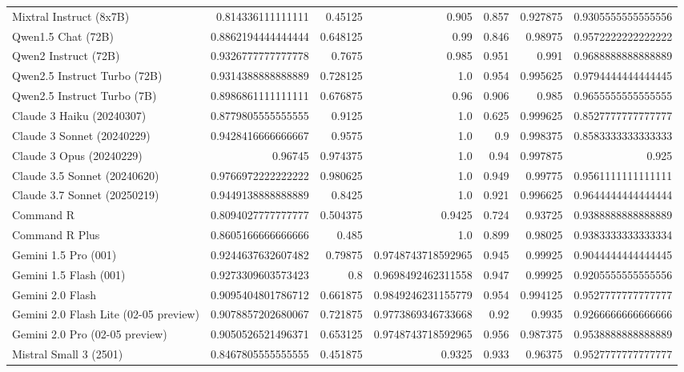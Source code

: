 \begin{table}[htp]
{\begin{tabular}{lrrrrrr}
Mixtral Instruct (8x7B) & 0.814336111111111 & 0.45125 & 0.905 & 0.857 & 0.927875 & 0.9305555555555556 \\
Qwen1.5 Chat (72B) & 0.8862194444444444 & 0.648125 & 0.99 & 0.846 & 0.98975 & 0.9572222222222222 \\
Qwen2 Instruct (72B) & 0.9326777777777778 & 0.7675 & 0.985 & 0.951 & 0.991 & 0.9688888888888889 \\
Qwen2.5 Instruct Turbo (72B) & 0.9314388888888889 & 0.728125 & 1.0 & 0.954 & 0.995625 & 0.9794444444444445 \\
Qwen2.5 Instruct Turbo (7B) & 0.8986861111111111 & 0.676875 & 0.96 & 0.906 & 0.985 & 0.9655555555555555 \\
Claude 3 Haiku (20240307) & 0.8779805555555555 & 0.9125 & 1.0 & 0.625 & 0.999625 & 0.8527777777777777 \\
Claude 3 Sonnet (20240229) & 0.9428416666666667 & 0.9575 & 1.0 & 0.9 & 0.998375 & 0.8583333333333333 \\
Claude 3 Opus (20240229) & 0.96745 & 0.974375 & 1.0 & 0.94 & 0.997875 & 0.925 \\
Claude 3.5 Sonnet (20240620) & 0.9766972222222222 & 0.980625 & 1.0 & 0.949 & 0.99775 & 0.9561111111111111 \\
Claude 3.7 Sonnet (20250219) & 0.9449138888888889 & 0.8425 & 1.0 & 0.921 & 0.996625 & 0.9644444444444444 \\
Command R & 0.8094027777777777 & 0.504375 & 0.9425 & 0.724 & 0.93725 & 0.9388888888888889 \\
Command R Plus & 0.8605166666666666 & 0.485 & 1.0 & 0.899 & 0.98025 & 0.9383333333333334 \\
Gemini 1.5 Pro (001) & 0.9244637632607482 & 0.79875 & 0.9748743718592965 & 0.945 & 0.99925 & 0.9044444444444445 \\
Gemini 1.5 Flash (001) & 0.9273309603573423 & 0.8 & 0.9698492462311558 & 0.947 & 0.99925 & 0.9205555555555556 \\
Gemini 2.0 Flash & 0.9095404801786712 & 0.661875 & 0.9849246231155779 & 0.954 & 0.994125 & 0.9527777777777777 \\
Gemini 2.0 Flash Lite (02-05 preview) & 0.9078857202680067 & 0.721875 & 0.9773869346733668 & 0.92 & 0.9935 & 0.9266666666666666 \\
Gemini 2.0 Pro (02-05 preview) & 0.9050526521496371 & 0.653125 & 0.9748743718592965 & 0.956 & 0.987375 & 0.9538888888888889 \\
Mistral Small 3 (2501) & 0.8467805555555555 & 0.451875 & 0.9325 & 0.933 & 0.96375 & 0.9527777777777777 \\

\end{tabular}}
\end{table}
